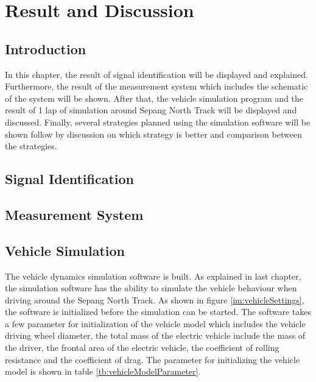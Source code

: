 \chapter{Result and Discussion}

\section{Introduction}
In this chapter, the result of signal identification will be displayed and explained. Furthermore, the result of the measurement system which includes the schematic of the system will be shown. After that, the vehicle simulation program and the result of 1 lap of simulation around Sepang North Track will be displayed and discussed. Finally, several strategies planned using the simulation software will be shown follow by discussion on which strategy is better and comparison between the strategies.

\section{Signal Identification}

\section{Measurement System}

\section{Vehicle Simulation}
The vehicle dynamics simulation software is built. As explained in last chapter, the simulation software has the ability to simulate the vehicle behaviour when driving around the Sepang North Track. As shown in figure \ref{im:vehicleSettings}, the software is initialized before the simulation can be started. The software takes a few parameter for initialization of the vehicle model which includes the vehicle driving wheel diameter, the total mass of the electric vehicle include the mass of the driver, the frontal area of the electric vehicle, the coefficient of rolling resistance and the coefficient of drag. The parameter for initializing the vehicle model is shown in table \ref{tb:vehicleModelParameter}.

